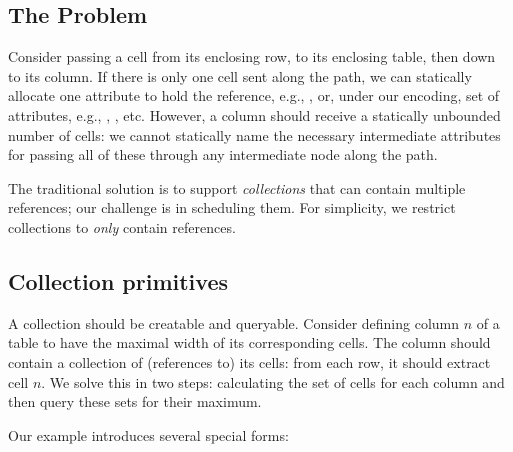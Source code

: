 
\subsection{The Problem}

Consider passing a cell from its enclosing row, to its enclosing table, then down to its column. If there is only one cell sent along the path, we can statically allocate one attribute to hold the reference, e.g., , or, under our encoding, set of attributes, e.g., , , etc. However, a column should receive a statically unbounded number of cells: we cannot statically name the necessary intermediate attributes for passing all of these through any intermediate node along the path.

The traditional solution is to support \emph{collections} that can contain multiple references; our challenge is in scheduling them. For simplicity, we restrict  collections to \emph{only} contain references.


\subsection{Collection primitives}

A collection should be creatable and queryable. Consider defining column $n$ of a table to have the maximal width of its corresponding cells. The column should contain a collection of (references to) its cells: from each row, it should extract cell $n$. We solve this in two steps: calculating the set of cells for each column and then query these sets for their maximum.

Our example introduces several special forms:

